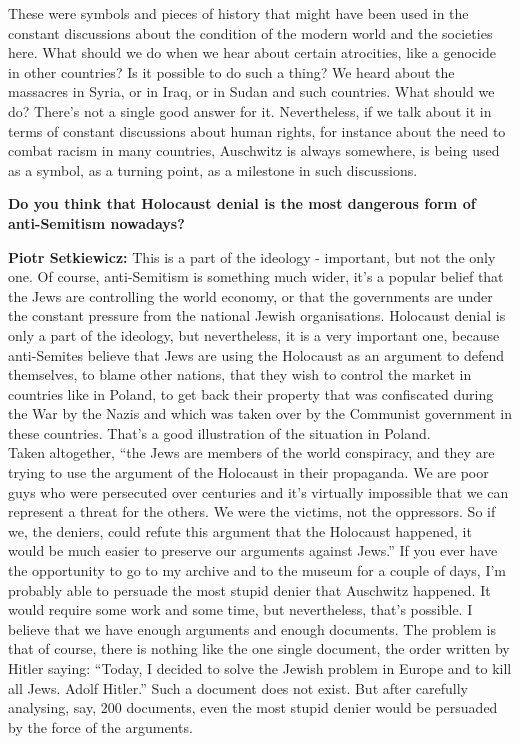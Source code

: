 These were symbols and pieces of history that might have been used in the constant discussions about the condition of the modern world and the societies here. What should we do when we hear about certain atrocities, like a genocide in other countries? Is it possible to do such a thing? We heard about the massacres in Syria, or in Iraq, or in Sudan and such countries. What should we do? There’s not a single good answer for it. Nevertheless, if we talk about it in terms of constant discussions about human rights, for instance about the need to combat racism in many countries, Auschwitz is always somewhere, is being used as a symbol, as a turning point, as a milestone in such discussions.
 
\textbf{Do you think that Holocaust denial is the most dangerous form of anti-Semitism nowadays?}

\textbf{Piotr Setkiewicz:} This is a part of the ideology - important, but not the only one. Of course, anti-Semitism is something much wider, it’s a popular belief that the Jews are controlling the world economy, or that the governments are under the constant pressure from the national Jewish organisations. Holocaust denial is only a part of the ideology, but nevertheless, it is a very important one, because anti-Semites believe that Jews are using the Holocaust as an argument to defend themselves, to blame other nations, that they wish to control the market in countries like in Poland, to get back their property that was confiscated during the War by the Nazis and which was taken over by the Communist government in these countries. That’s a good illustration of the situation in Poland.\\ Taken altogether, ``the Jews are members of the world conspiracy, and they are trying to use the argument of the Holocaust in their propaganda. We are poor guys who were persecuted over centuries and it’s virtually impossible that we can represent a threat for the others. We were the victims, not the oppressors. So if we, the deniers, could refute this argument that the Holocaust happened, it would be much easier to preserve our arguments against Jews.'' 
If you ever have the opportunity to go to my archive and to the museum for a couple of days, I’m probably able to persuade the most stupid denier that Auschwitz happened. It would require some work and some time, but nevertheless, that’s possible. I believe that we have enough arguments and enough documents. The problem is that of course, there is nothing like the one single document, the order written by Hitler saying: ``Today, I decided to solve the Jewish problem in Europe and to kill all Jews. Adolf Hitler.'' Such a document does not exist. But after carefully analysing, say, 200 documents, even the most stupid denier would be persuaded by the force of the arguments.